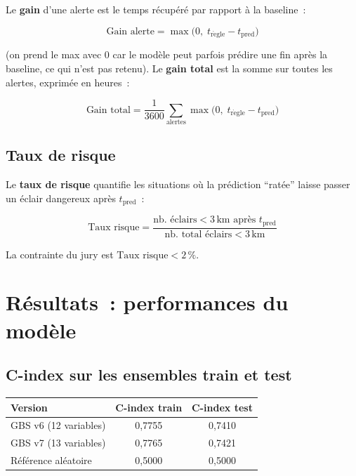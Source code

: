 \documentclass[a4paper,11pt]{article}
\newcommand{\tpred}{t_{\mathrm{pred}}}
\newcommand{\trule}{t_{\mathrm{r\grave{e}gle}}}
\begin{document}
Le \textbf{gain} d'une alerte est le temps récupéré par rapport à la baseline~:

\begin{equation}
  \text{Gain alerte} = \max\!\bigl(0,\; \trule - \tpred\bigr)
  \label{eq:gain}
\end{equation}

(on prend le max avec 0 car le modèle peut parfois prédire une fin après la baseline, ce qui
n'est pas retenu). Le \textbf{gain total} est la somme sur toutes les alertes, exprimée en heures~:

\begin{equation}
  \text{Gain total} = \frac{1}{3600} \sum_{\text{alertes}} \max\!\bigl(0,\; \trule - \tpred\bigr)
  \label{eq:gain_total}
\end{equation}

\subsection{Taux de risque}

Le \textbf{taux de risque} quantifie les situations où la prédiction ``ratée'' laisse passer
un éclair dangereux après $\tpred$~:

\begin{equation}
  \text{Taux risque} = \frac{\text{nb. éclairs} < 3\,\text{km après } \tpred}
                       {\text{nb. total éclairs} < 3\,\text{km}}
  \label{eq:risque}
\end{equation}

La contrainte du jury est $\text{Taux risque} < 2\,\%$.

\section{Résultats~: performances du modèle}

\subsection{C-index sur les ensembles train et test}

\begin{tcolorbox}[resultstyle, title={C-index train/test (données 2018--2022)}]
\begin{center}
\begin{tabular}{lcc}
\toprule
\textbf{Version} & \textbf{C-index train} & \textbf{C-index test} \\
\midrule
GBS v6 (12 variables) & 0,7755 & 0,7410 \\
GBS v7 (13 variables) & 0,7765 & 0,7421 \\
\midrule
Référence aléatoire & 0,5000 & 0,5000 \\
\bottomrule
\end{tabular}
\end{center}
\end{tcolorbox}
\end{document}
